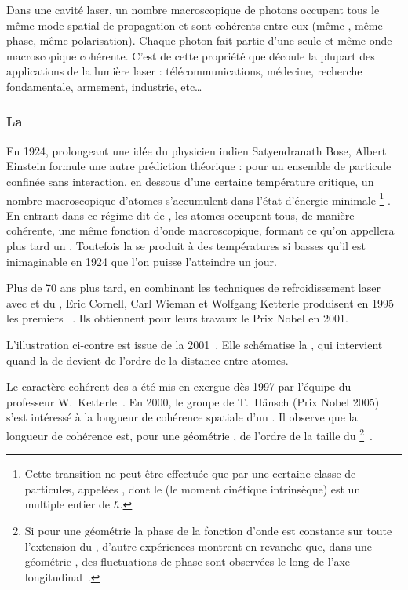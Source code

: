Dans une cavité laser, un nombre macroscopique de photons occupent tous le même mode spatial de propagation et sont cohérents entre eux (même \lo, même phase, même polarisation). 
Chaque photon fait partie d'une seule et même onde macroscopique cohérente. C'est de cette propriété que découle la plupart des applications de la lumière laser : télécommunications, médecine, recherche fondamentale, armement, industrie, etc\ldots

{\AjouteLigne}

\subsubsection{La \cbe}
En 1924, prolongeant une idée du physicien indien Satyendranath Bose, Albert Einstein formule une autre prédiction théorique : pour un ensemble de particule confinée sans interaction, en dessous d'une certaine température critique, un nombre macroscopique d'atomes s'accumulent dans l'état d'énergie minimale%
\footnote{Cette transition ne peut être effectuée que par une certaine classe de particules, appelées , dont le  (le moment cinétique intrinsèque) est un multiple entier de $\hbar$.}%
. 
En entrant dans ce régime dit de , les atomes occupent tous, de manière cohérente, une même fonction d'onde macroscopique, formant 
\vspace{-1.5ex}
\noindent
ce qu'on appellera plus tard un \termetech{\bec}. 
Toutefois la \condbe se produit à des températures si basses qu'il est inimaginable en 1924 que l'on puisse l'atteindre un jour.

Plus de 70 ans plus tard, en combinant les techniques de refroidissement laser avec et du \termetech{\rpef}, Eric Cornell, Carl Wieman et Wolfgang Ketterle produisent en 1995 les premiers \becs~\cite{AEM95,DMA95}. Ils obtiennent pour leurs travaux le Prix Nobel en 2001.

L'illustration ci-contre est issue de la  2001~\cite{Ket02}. Elle schématise la \condbe, qui intervient quand la \lo de \dB devient de l'ordre de la distance entre atomes.

\casse

Le caractère cohérent des \bec a été mis en exergue dès 1997 par l'équipe du professeur W.~Ketterle~\cite{ATM97}. 
En 2000, le groupe de T.~Hänsch (Prix Nobel 2005) s'est intéressé à la longueur de cohérence spatiale d'un \bec. Il observe que la longueur de cohérence est, pour une géométrie \tde, de l'ordre de la taille du \becc%
\footnote{Si pour une géométrie \tde la phase de la fonction d'onde est constante sur toute l'extension du \becc, d'autre expériences montrent en revanche que, dans une géométrie \ude, des fluctuations de phase sont observées le long de l'axe longitudinal~\cite{DHR01,RGT03}.}~\cite{BHE00}.

